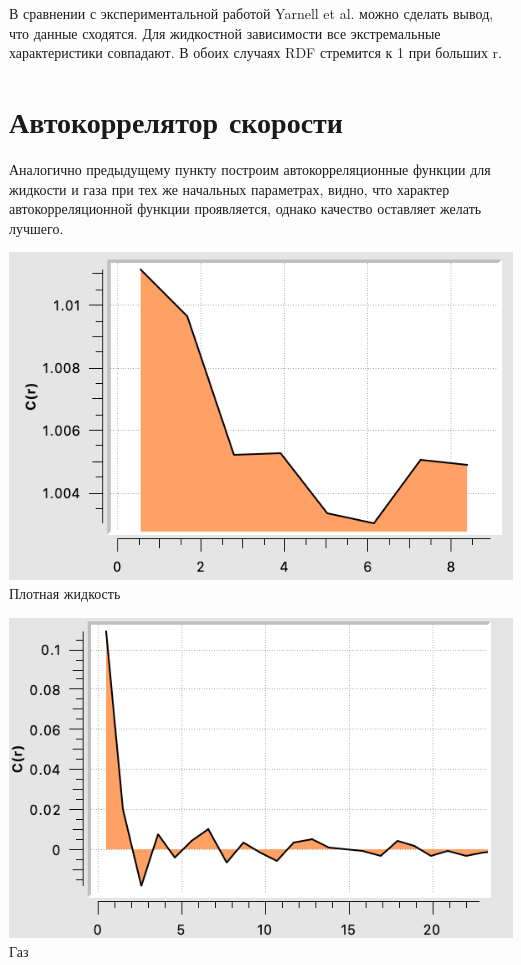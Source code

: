 В сравнении с экспериментальной работой Yarnell et al. можно сделать вывод, что данные сходятся. Для жидкостной зависимости все экстремальные характеристики совпадают. В обоих случаях RDF стремится к 1 при больших r. 

\section{Автокоррелятор скорости}

Аналогично предыдущему пункту построим автокорреляционные функции для жидкости и газа при тех же начальных параметрах, видно, что характер автокорреляционной функции проявляется, однако качество оставляет желать лучшего.  \\

\newline

\begin{minipage}{0.47\textwidth}
    \begin{center}
        \includegraphics[width=\linewidth]{4.png}\\
        Плотная жидкость
    \end{center}
   
\end{minipage}
\begin{minipage}{0.47\textwidth}
    \begin{center}
        \includegraphics[width=\linewidth]{3.png}\\
        Газ
    \end{center}
\end{minipage}



